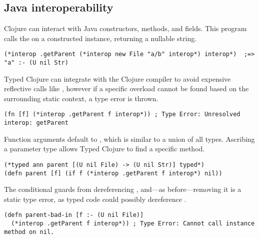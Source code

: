 \subsection{Java interoperability}
\label{sec:overviewjavainterop}

Clojure can interact with Java constructors, methods, and fields.
This program calls the  on a constructed
instance, returning a nullable string.

\begin{exmp}
\begin{lstlisting}
(*interop .getParent (*interop new File "a/b" interop*) interop*)  ;=> "a" :- (U nil Str)
\end{lstlisting}
\label{example:getparent-direct-constructor}
\end{exmp}
%
Typed Clojure can integrate with the Clojure compiler to avoid expensive reflective 
calls like , however if a specific overload cannot be found based on the
surrounding static context, a type error is thrown.
%
\begin{lstlisting}
(fn [f] (*interop .getParent f interop*)) ; Type Error: Unresolved interop: getParent
\end{lstlisting}
%
Function arguments default to , which is similar to a union of all types. Ascribing
a parameter type allows Typed Clojure to find a specific method.


\begin{exmp}
\begin{lstlisting}
(*typed ann parent [(U nil File) -> (U nil Str)] typed*)
(defn parent [f] (if f (*interop .getParent f interop*) nil))
\end{lstlisting}
\label{example:parent-if}
\end{exmp}


The conditional guards from dereferencing , and---as before---removing 
it is a static type error, as typed code could possibly dereference .
\begin{lstlisting}
(defn parent-bad-in [f :- (U nil File)]
  (*interop .getParent f interop*)) ; Type Error: Cannot call instance method on nil.
\end{lstlisting}

